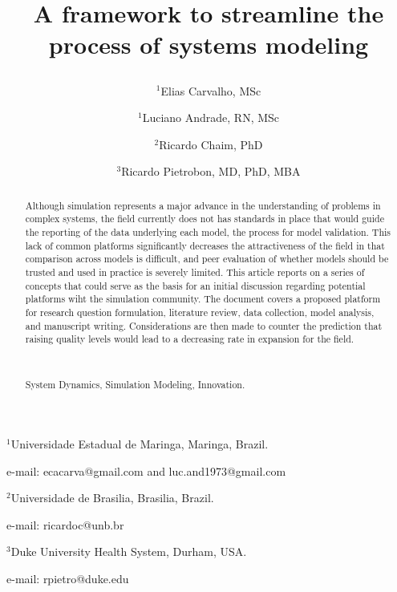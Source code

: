 \documentclass[11pt]{article}
\def\noi{\noindent}
\begin{document}

\title{%
A framework to streamline the process of systems modeling
\author{$^1$Elias Carvalho, MSc
\and $^1$Luciano Andrade, RN, MSc
\and $^2$Ricardo Chaim, PhD  
\and $^3$Ricardo Pietrobon, MD, PhD, MBA
}
\date{}
}
\maketitle

\noi $^1$Universidade Estadual de Maringa,  Maringa, Brazil.

\noi e-mail: ecacarva@gmail.com and luc.and1973@gmail.com %

\medskip

\noi $^2$Universidade de Brasilia, Brasilia, Brazil.

\noi e-mail: ricardoc@unb.br

\medskip

\noi $^3$Duke University Health System, Durham, USA.

\noi e-mail: rpietro@duke.edu



\begin{abstract}
Although simulation represents a major advance in the understanding of problems in complex systems, the field currently does not has standards in place that would guide the reporting of the data underlying each model, the process for model validation.  This lack of common platforms significantly decreases the attractiveness of the field in that comparison across models is difficult, and peer evaluation of whether models should be trusted and used in practice is severely limited.  This article reports on a series of concepts that could serve as the basis for an initial discussion regarding potential platforms wiht the simulation community.  The document covers a proposed platform for research question formulation, literature review, data collection, model analysis, and manuscript writing.  Considerations are then made to counter the prediction that raising quality levels would lead to a decreasing rate in expansion for the field.

\

 System Dynamics, Simulation Modeling, Innovation.

\end{abstract}
\end{document}
